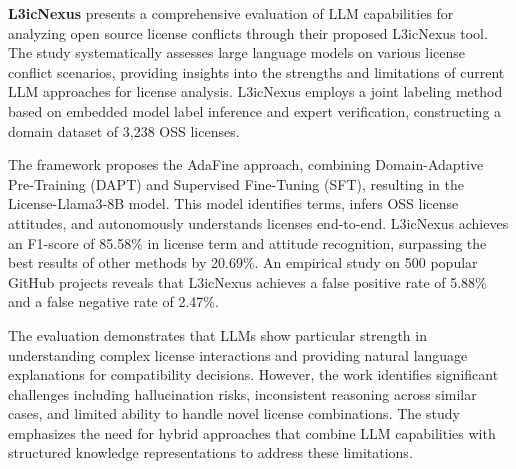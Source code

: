 \textbf{L3icNexus} \cite{CuiW0LYO25} presents a comprehensive evaluation of LLM capabilities for analyzing open source license conflicts through their proposed L3icNexus tool. The study systematically assesses large language models on various license conflict scenarios, providing insights into the strengths and limitations of current LLM approaches for license analysis. L3icNexus employs a joint labeling method based on embedded model label inference and expert verification, constructing a domain dataset of 3,238 OSS licenses.

The framework proposes the AdaFine approach, combining Domain-Adaptive Pre-Training (DAPT) and Supervised Fine-Tuning (SFT), resulting in the License-Llama3-8B model. This model identifies terms, infers OSS license attitudes, and autonomously understands licenses end-to-end. L3icNexus achieves an F1-score of 85.58\% in license term and attitude recognition, surpassing the best results of other methods by 20.69\%. An empirical study on 500 popular GitHub projects reveals that L3icNexus achieves a false positive rate of 5.88\% and a false negative rate of 2.47\%.

The evaluation demonstrates that LLMs show particular strength in understanding complex license interactions and providing natural language explanations for compatibility decisions. However, the work identifies significant challenges including hallucination risks, inconsistent reasoning across similar cases, and limited ability to handle novel license combinations. The study emphasizes the need for hybrid approaches that combine LLM capabilities with structured knowledge representations to address these limitations.

\begin{comment}
\textbf{LARK Framework} represents our integrated approach that combines knowledge graph constraints with large language model capabilities and retrieval-augmented generation to address the limitations identified in existing LLM-based approaches. Our framework leverages Neo4j knowledge graphs to provide structured reasoning over license relationships while employing GPT-4 for natural language query processing and explanation generation. The integration of RAG enables precise citation-backed explanations, addressing the hallucination risks and inconsistent reasoning patterns identified in existing LLM approaches.

LARK achieves 98.1\% accuracy in license detection and 96.2\% accuracy in compatibility analysis, representing significant improvements over existing approaches. The framework demonstrates particular strength in handling custom licenses through automated term parsing, providing comprehensive explanations with verifiable citations, and enabling rapid updates through dynamic knowledge graph modifications. Our approach addresses the key limitations identified in existing LLM-based systems by providing structured reasoning capabilities, reducing hallucination through knowledge graph constraints, and ensuring consistent decision-making across similar scenarios.
\end{comment}


